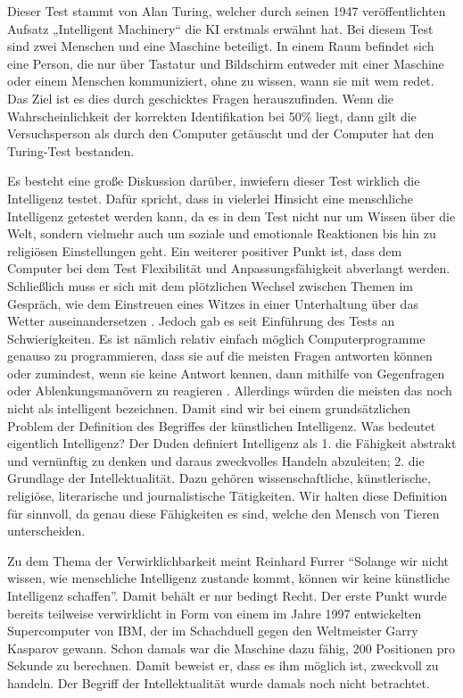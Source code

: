 Dieser Test stammt von Alan Turing, welcher durch seinen 1947 veröffentlichten Aufsatz „Intelligent Machinery“ die KI erstmals erwähnt hat. Bei diesem Test sind zwei Menschen und eine Maschine beteiligt. In einem Raum befindet sich eine Person, die nur über Tastatur und Bildschirm entweder mit einer Maschine oder einem Menschen kommuniziert, ohne zu wissen, wann sie mit wem redet. Das Ziel ist es dies durch geschicktes Fragen herauszufinden. Wenn die Wahrscheinlichkeit der korrekten Identifikation bei 50\% liegt, dann gilt die Versuchsperson als durch den Computer getäuscht und der Computer hat den Turing-Test bestanden.  

Es besteht eine große Diskussion darüber, inwiefern dieser Test wirklich die Intelligenz testet. Dafür spricht, dass in vielerlei Hinsicht eine menschliche Intelligenz getestet werden kann, da es in dem Test nicht nur um Wissen über die Welt, sondern vielmehr auch um soziale und emotionale Reaktionen bis hin zu religiösen Einstellungen geht. Ein weiterer positiver Punkt ist, dass dem Computer bei dem Test Flexibilität und Anpassungsfähigkeit abverlangt werden. Schließlich muss er sich mit dem plötzlichen Wechsel zwischen Themen im Gespräch, wie dem Einstreuen eines Witzes in einer Unterhaltung über das Wetter auseinandersetzen \cite{TheGuardian_1}. 
Jedoch gab es seit Einführung des Tests an Schwierigkeiten. Es ist nämlich relativ einfach möglich Computerprogramme genauso zu programmieren, dass sie auf die meisten Fragen antworten können oder zumindest, wenn sie keine Antwort kennen,  dann mithilfe von Gegenfragen oder Ablenkungsmanövern zu reagieren \cite{NewAtlantis}.  Allerdings würden die meisten das noch nicht als intelligent bezeichnen.
Damit sind wir bei einem grundsätzlichen Problem der Definition des Begriffes der künstlichen Intelligenz. Was bedeutet eigentlich Intelligenz? 
Der Duden definiert Intelligenz als
1. die Fähigkeit abstrakt und vernünftig zu denken und daraus zweckvolles Handeln abzuleiten;
2. die Grundlage der Intellektualität. Dazu gehören wissenschaftliche, künstlerische, religiöse, literarische und journalistische Tätigkeiten. 
Wir halten diese Definition für sinnvoll, da genau diese Fähigkeiten es sind, welche den Mensch von Tieren unterscheiden.

Zu dem Thema der Verwirklichbarkeit meint Reinhard Furrer  \enquote{Solange wir nicht wissen, wie menschliche Intelligenz zustande kommt, können wir keine künstliche Intelligenz schaffen}. Damit behält er nur bedingt Recht. Der erste Punkt wurde bereits teilweise verwirklicht in Form von einem im Jahre 1997 entwickelten Supercomputer von IBM, der im Schachduell gegen den Weltmeister Garry Kasparov gewann. Schon damals war die Maschine dazu fähig, 200 Positionen pro Sekunde zu berechnen. Damit beweist er, dass es ihm möglich ist, zweckvoll zu handeln. Der Begriff der Intellektualität wurde damals noch nicht betrachtet. 

